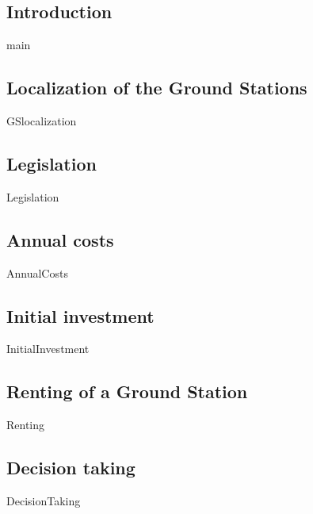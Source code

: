 \subsection{Introduction}
{main}

\subsection{Localization of the Ground Stations}
{GSlocalization}

\subsection{Legislation}
{Legislation}

\subsection{Annual costs}
{AnnualCosts}

\subsection{Initial investment}
{InitialInvestment}

\subsection{Renting of a Ground Station}
{Renting}

\subsection{Decision taking}
{DecisionTaking}

%
%
